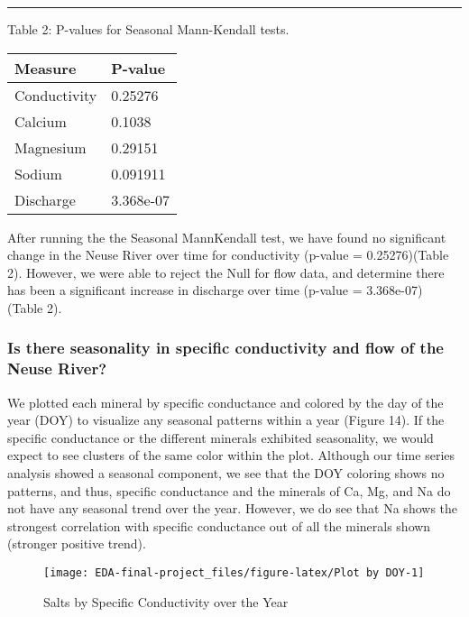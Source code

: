 \documentclass[
  12pt,
]{article}
\begin{document}
\newpage

\begin{center}\rule{0.5\linewidth}{0.5pt}\end{center}

Table 2: P-values for Seasonal Mann-Kendall tests.

\begin{longtable}[]{@{}ll@{}}
\toprule
Measure & P-value \\
\midrule
\endhead
Conductivity & 0.25276 \\
Calcium & 0.1038 \\
Magnesium & 0.29151 \\
Sodium & 0.091911 \\
Discharge & 3.368e-07 \\
\bottomrule
\end{longtable}

After running the the Seasonal MannKendall test, we have found no
significant change in the Neuse River over time for conductivity
(p-value = 0.25276)(Table 2). However, we were able to reject the Null
for flow data, and determine there has been a significant increase in
discharge over time (p-value = 3.368e-07) (Table 2).

\newpage

\hypertarget{is-there-seasonality-in-specific-conductivity-and-flow-of-the-neuse-river}{%
\subsubsection{Is there seasonality in specific conductivity and flow of
the Neuse
River?}\label{is-there-seasonality-in-specific-conductivity-and-flow-of-the-neuse-river}}

We plotted each mineral by specific conductance and colored by the day
of the year (DOY) to visualize any seasonal patterns within a year
(Figure 14). If the specific conductance or the different minerals
exhibited seasonality, we would expect to see clusters of the same color
within the plot. Although our time series analysis showed a seasonal
component, we see that the DOY coloring shows no patterns, and thus,
specific conductance and the minerals of Ca, Mg, and Na do not have any
seasonal trend over the year. However, we do see that Na shows the
strongest correlation with specific conductance out of all the minerals
shown (stronger positive trend).

\begin{figure}

{\centering \texttt{[image: EDA-final-project\_files/figure-latex/Plot by DOY-1]} 

}

\caption{Salts by Specific Conductivity over the Year}\label{fig:Plot by DOY}
\end{figure}
\end{document}
